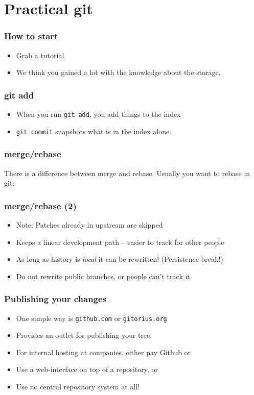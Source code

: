 \documentclass[xcolor=pdftex,dvipsnames]{beamer}
\begin{document}
\section{Practical git}
\begin{frame}
  \frametitle{How to start}
  \begin{itemize}
  \item Grab a tutorial
  \item We think you gained a lot with the knowledge about the
    storage.
  \end{itemize}
\end{frame}

\begin{frame}
  \frametitle{git add}
  \begin{itemize}
  \item When you run \texttt{git add}, you add things to the index
  \item \texttt{git commit} snapshots what is in the index alone.
  \end{itemize}
\end{frame}

\begin{frame}
  \frametitle{merge/rebase}
  There is a difference between merge and rebase. Usually you want to
  rebase in git:
\end{frame}

\begin{frame}
  \frametitle{merge/rebase (2)}
  \begin{itemize}
  \item Note: Patches already in upstream are skipped
  \item Keeps a linear development path -- easier to track for other
    people
  \item As long as history is \emph{local} it can be rewritten!
    (Persistence break!)
  \item Do not rewrite public branches, or people can't track it.
  \end{itemize}
\end{frame}

\begin{frame}
  \frametitle{Publishing your changes}
  \begin{itemize}
  \item One simple way is \texttt{github.com} or \texttt{gitorius.org}
  \item Provides an outlet for publishing your tree.
  \item For internal hosting at companies, either pay Github or
  \item Use a web-interface on top of a repository, or
  \item Use no central repository system at all!
  \end{itemize}
\end{frame}
\end{document}
